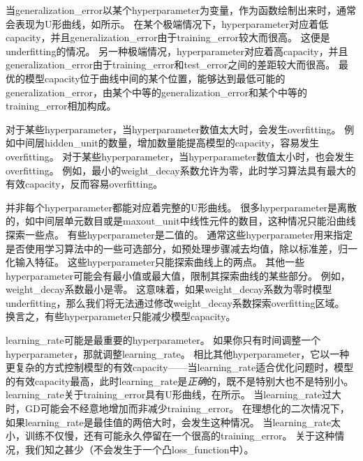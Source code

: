 

当\gls{generalization_error}以某个\gls{hyperparameter}为变量，作为函数绘制出来时，通常会表现为U形曲线，如所示。
在某个极端情况下，\gls{hyperparameter}对应着低\gls{capacity}，并且\gls{generalization_error}由于\gls{training_error}较大而很高。
这便是\gls{underfitting}的情况。
另一种极端情况，\gls{hyperparameter}对应着高\gls{capacity}，并且\gls{generalization_error}由于\gls{training_error}和\gls{test_error}之间的差距较大而很高。
最优的模型\gls{capacity}位于曲线中间的某个位置，能够达到最低可能的\gls{generalization_error}，由某个中等的\gls{generalization_error}和某个中等的\gls{training_error}相加构成。



对于某些\gls{hyperparameter}，当\gls{hyperparameter}数值太大时，会发生\gls{overfitting}。
例如中间层\gls{hidden_unit}的数量，增加数量能提高模型的\gls{capacity}，容易发生\gls{overfitting}。%
对于某些\gls{hyperparameter}，当\gls{hyperparameter}数值太小时，也会发生\gls{overfitting}。
例如，最小的\gls{weight_decay}系数允许为零，此时学习算法具有最大的有效\gls{capacity}，反而容易\gls{overfitting}。%


并非每个\gls{hyperparameter}都能对应着完整的U形曲线。
很多\gls{hyperparameter}是离散的，如中间层单元数目或是\gls{maxout_unit}中线性元件的数目，这种情况只能沿曲线探索一些点。
有些\gls{hyperparameter}是二值的。
通常这些\gls{hyperparameter}用来指定是否使用学习算法中的一些可选部分，如预处理步骤减去均值，除以标准差，归一化输入特征。
这些\gls{hyperparameter}只能探索曲线上的两点。
其他一些\gls{hyperparameter}可能会有最小值或最大值，限制其探索曲线的某些部分。%
例如，\gls{weight_decay}系数最小是零。
这意味着，如果\gls{weight_decay}系数为零时模型\gls{underfitting}，那么我们将无法通过修改\gls{weight_decay}系数探索\gls{overfitting}区域。
换言之，有些\gls{hyperparameter}只能减少模型\gls{capacity}。


\gls{learning_rate}可能是最重要的\gls{hyperparameter}。
如果你只有时间调整一个\gls{hyperparameter}，那就调整\gls{learning_rate}。
相比其他\gls{hyperparameter}，它以一种更复杂的方式控制模型的有效\gls{capacity}——当\gls{learning_rate}适合优化问题时，模型的有效\gls{capacity}最高，此时\gls{learning_rate}是\emph{正确}的，既不是特别大也不是特别小。
\gls{learning_rate}关于\gls{training_error}具有U形曲线，在所示。
当\gls{learning_rate}过大时，\gls{GD}可能会不经意地增加而非减少\gls{training_error}。
在理想化的二次情况下，如果\gls{learning_rate}是最佳值的两倍大时，会发生这种情况\citep{LeCun+98backprop-small}。
当\gls{learning_rate}太小，训练不仅慢，还有可能永久停留在一个很高的\gls{training_error}。
关于这种情况，我们知之甚少（不会发生于一个凸\gls{loss_function}中）。

